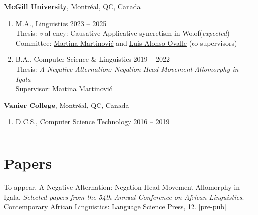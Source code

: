 \documentclass[margin,line]{resume}
\begin{document}
\begin{resume}
	\textbf{McGill University}, Montr\'{e}al, QC, Canada
	\begin{enumerate}[-, leftmargin=1em, topsep=2pt]
		\item[] M.A., %
		      Linguistics%
		      \hfill 2023 -- 2025 \\
			  {\small Thesis: {\it v}-al-ency: Causative-Applicative syncretism in Wolof\hfill (\textit{expected})\\
			  Committee: \href{https://inamartinovic.com/}{Martina Martinović} and \href{https://people.linguistics.mcgill.ca/~luis.alonso-ovalle/}{Luis Alonso-Ovalle} (co-supervisors)}\vspace{0.2em}
		\item[] B.A., %
		      Computer Science %
		      \& %
		      Linguistics%
		      \hfill 2019 -- 2022\\
			  {\small Thesis: {\it A Negative Alternation: Negation Head Movement Allomorphy in Igala}\\
			  Supervisor: Martina Martinović}
	\end{enumerate}

	\textbf{Vanier College}, Montr\'{e}al, QC, Canada
	\begin{enumerate}[-, leftmargin=1em, topsep=2pt]
		\item[]  D.C.S., Computer Science Technology \hfill 2016 -- 2019
	\end{enumerate}

	\vspace{-1em}\rule{\textwidth}{0.4pt}




	\vspace{-0.7em}

	\section{\mysidestyle Papers}

	 {To appear. A Negative Alternation: Negation Head Movement Allomorphy in Igala. \textit{Selected papers from the 54th Annual Conference on African Linguistics}. Contemporary African Linguistics: Language Science Press, 12. [\href{run:../papers/chaperon_acal_neg_move.pdf}{pre-pub}]}


\end{resume}
\end{document}
